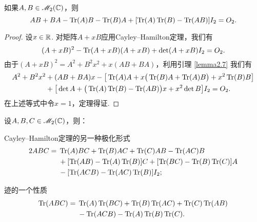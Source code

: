 \begin{mybox}
  \begin{theorem}

    如果$A,B\in\mathscr M_2(\mathbb C)$，则
    \[
      AB + BA - \operatorname{Tr}(A)B - \operatorname{Tr}(B)A + [
      \operatorname{Tr}(A)\operatorname{Tr}(B) - \operatorname{Tr}(AB)]I_2 = O_2.
    \]
  \end{theorem}
\end{mybox}

\begin{proof}
  设$x\in\mathbb R$. 对矩阵$A+xB$应用Cayley--Hamilton定理，我们有
  \[
    (A + xB)^2 - \operatorname{Tr}(A + xB)(A + xB) + \det(A + xB)I_2 = O_2.
  \]
  由于$(A+xB)^2=A^2+B^2x^2+x(AB+BA)$，利用引理 \ref{lemma2.7} 我们有
  \begin{align*}
    A^2 + B^2x^2 & + (AB + BA)x - \big[
      \operatorname{Tr}(A)A + x\big( \operatorname{Tr}(B)A + \operatorname{Tr}(A)B \big) + x^2\operatorname{Tr}(B)B
    \big]\\
    & + \big[
      \det A + \big( \operatorname{Tr}(A)\operatorname{Tr}(B) - \operatorname{Tr}(AB)\big)x
      + x^2\det B
    \big]I_2 = O_2.
  \end{align*}
  在上述等式中令$x=1$，定理得证.
\end{proof}

\begin{mybox}
  \begin{corollary}
    设$A,B,C\in\mathscr M_2(\mathbb C)$，则：
    \begin{enum}
      \item\label{coro2.3a} Cayley--Hamilton定理的另一种极化形式
      \begin{align*}
        2ABC = {}& \operatorname{Tr}(A)BC + \operatorname{Tr}(B)AC + \operatorname{Tr}(C)AB - \operatorname{Tr}(AC) B \\
        & + [\operatorname{Tr}(AB) - \operatorname{Tr}(A)\operatorname{Tr}(B)]C + [\operatorname{Tr}(BC) - \operatorname{Tr}(B)\operatorname{Tr}(C)]A \\
        & - [\operatorname{Tr}(ACB) - \operatorname{Tr}(AC)\operatorname{Tr}(B)]I_2;
      \end{align*}
      \item 迹的一个性质
      \begin{align*}
        \operatorname{Tr}(ABC) = {}& \operatorname{Tr}(A)\operatorname{Tr}(BC) + \operatorname{Tr}(B)\operatorname{Tr}(AC) + \operatorname{Tr}(C)\operatorname{Tr}(AB) \\
        & - \operatorname{Tr}(ACB) - \operatorname{Tr}(A)\operatorname{Tr}(B)\operatorname{Tr}(C).
      \end{align*}
    \end{enum}
  \end{corollary}
\end{mybox}

